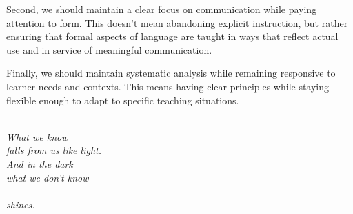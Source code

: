 Second, we should maintain a clear focus on communication while paying attention to form. This doesn't mean abandoning explicit instruction, but rather ensuring that formal aspects of language are taught in ways that reflect actual use and in service of meaningful communication.

Finally, we should maintain systematic analysis while remaining responsive to learner needs and contexts. This means having clear principles while staying flexible enough to adapt to specific teaching situations.


\cleardoublepage\newpage
\thispagestyle{empty}


\epigraph{\textit{\phantom{~}\\[10em]
What we know\\
falls from us like light.\\
\phantom{~~~~}And in the dark\\
\phantom{~~~~}what we don't know\\\\
\phantom{~~~~~~~~~~~~~~~~~~~~~~~~~~~~~~~}shines.\\}}{}
\newpage
